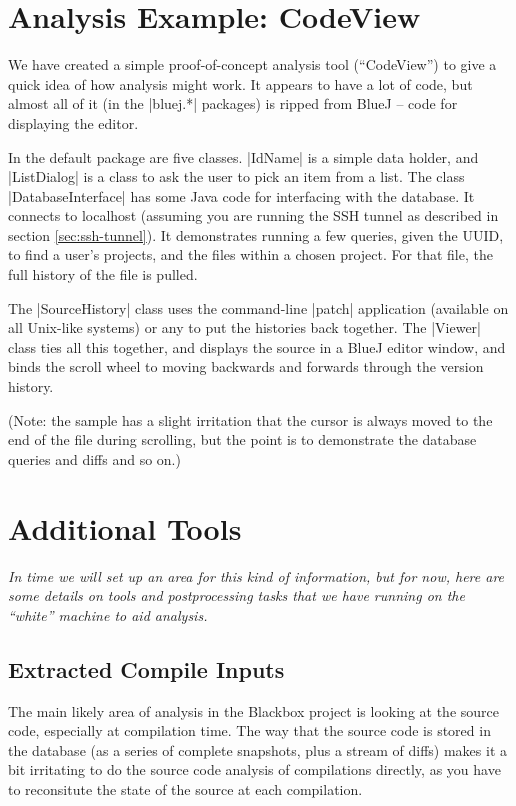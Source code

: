 \documentclass{report}
\begin{document}
\chapter{Analysis Example: CodeView}
\label{sec:example_codeview}

We have created a simple proof-of-concept analysis tool (``CodeView'') to give a quick idea
of how analysis might work.  It appears to have a lot of code, but almost all
of it (in the |bluej.*| packages) is ripped from BlueJ -- code for displaying
the editor.

In the default package are five classes.  |IdName| is a simple data holder,
and |ListDialog| is a class to ask the user to pick an item from a list.  The
class |DatabaseInterface| has some Java code for interfacing with the
database.  It connects to localhost (assuming you are running the SSH tunnel
as described in section \ref{sec:ssh-tunnel}).  It demonstrates running a few
queries, given the UUID, to find a user's projects, and the files within a
chosen project.  For that file, the full history of the file is pulled.

The |SourceHistory| class uses the command-line |patch| application (available on all Unix-like systems) or any
to put the histories back together.  The |Viewer| class ties all this
together, and displays the source in a BlueJ editor window, and binds the
scroll wheel to moving backwards and forwards through the version history.

(Note: the sample has a slight irritation that the cursor is always moved to the end
of the file during scrolling, but the point is to demonstrate the database
queries and diffs and so on.)

\chapter{Additional Tools}
\label{sec:postprocess}

\textit{In time we will set up an area for this kind of information, but for
now, here are some details on tools and postprocessing tasks that we have
running on the ``white'' machine to aid analysis.}

\section{Extracted Compile Inputs}

The main likely area of analysis in the Blackbox project is looking at
the source code, especially at compilation time.  The way that the
source code is stored in the database (as a series of complete
snapshots, plus a stream of diffs) makes it a bit irritating to do the
source code analysis of compilations directly, as you have to
reconsitute the state of the source at each compilation.
\end{document}
